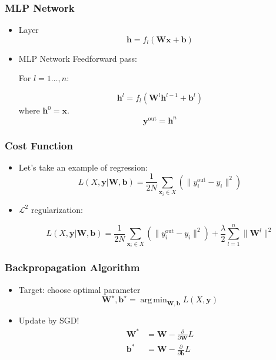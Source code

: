\documentclass{beamer}
\DeclareMathOperator*{\argmin}{arg\,min}
\begin{document}
\begin{frame}
  \frametitle{MLP Network}
  
  \begin{itemize}
    \item Layer
      \begin{equation*}
        \mathbf{h}=f_{l}(\mathbf{W}\mathbf{x}+\mathbf{b})
      \end{equation*}
    \item MLP Network Feedforward pass:

      For $l=1\ldots,n$:

      \begin{equation*}
        \mathbf{h}^{l}=f_{l}(\mathbf{W}^{l}\mathbf{h}^{l-1}+\mathbf{b}^{l})
      \end{equation*}
      where $\mathbf{h}^{0}=\mathbf{x}$.
      \begin{equation*}
        \mathbf{y}^{\text{out}}=\mathbf{h}^{n}
      \end{equation*}
  \end{itemize}
\end{frame}

\begin{frame}
  \frametitle{Cost Function}

  \begin{itemize}
    \item Let's take an example of regression:
      \begin{equation*}
        L(X, \mathbf{y}|\mathbf{W}, \mathbf{b})=\frac{1}{2N}\sum_{\mathbf{x}_{i}\in X}\left(\|y_{i}^{\text{out}}-y_{i}\|^{2}\right)
      \end{equation*}

    \item $\mathcal{L}^{2}$ regularization:

      \begin{equation*}
        L(X, \mathbf{y}|\mathbf{W}, \mathbf{b})=\frac{1}{2N}\sum_{\mathbf{x}_{i}\in X}\left(\|y_{i}^{\text{out}}-y_{i}\|^{2}\right)+\frac{\lambda}{2}\sum_{l=1}^{n}\|\mathbf{W}^{l}\|^{2}
      \end{equation*}
  \end{itemize}
  
\end{frame}

\begin{frame}
  \frametitle{Backpropagation Algorithm}
  
  \begin{itemize}
    \item Target: choose optimal parameter
      \begin{equation*}
        \mathbf{W}^{\star}, \mathbf{b}^{\star}=\argmin_{\mathbf{W}, \mathbf{b}}L(X, \mathbf{y})
      \end{equation*}
    \item Update by SGD!
      \begin{align*}
        \mathbf{W}^{*}&=\mathbf{W}-\frac{\partial}{\partial\mathbf{W}}L \\
        \mathbf{b}^{*}&=\mathbf{W}-\frac{\partial}{\partial\mathbf{b}}L
      \end{align*}
  \end{itemize}
\end{frame}
\end{document}
